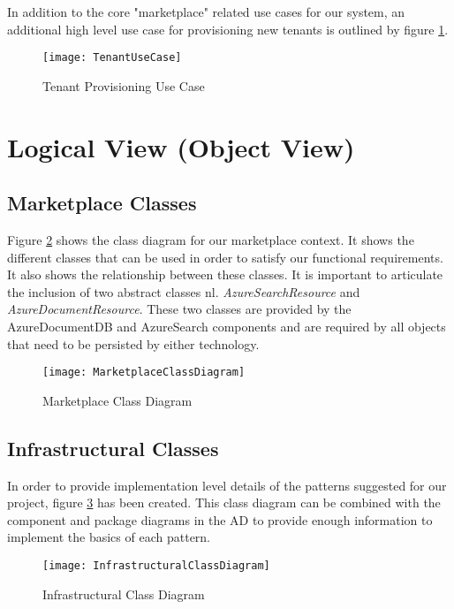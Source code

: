 In addition to the core "marketplace" related use cases for our system, an additional high level use case for provisioning new tenants is outlined by figure \ref{fig:tenantusecase}.

\begin{figure}
\centering
\texttt{[image: TenantUseCase]}
\caption{Tenant Provisioning Use Case}
\label{fig:tenantusecase}
\end{figure}

\section{Logical View (Object View)}

\subsection{Marketplace Classes}
Figure \ref{fig:marketclass} shows the class diagram for our marketplace context. It shows the different classes that can be used in order to satisfy our functional requirements. It also shows the relationship between these classes. It is important to articulate the inclusion of two abstract classes nl. \textit{AzureSearchResource} and \textit{AzureDocumentResource}. These two classes are provided by the AzureDocumentDB and AzureSearch components and are required by all objects that need to be persisted by either technology. 

\begin{figure}
\centering
\texttt{[image: MarketplaceClassDiagram]}
\caption{Marketplace Class Diagram}
\label{fig:marketclass}
\end{figure}

\subsection{Infrastructural Classes}
In order to provide implementation level details of the patterns suggested for our project, figure \ref{fig:infraclass} has been created. This class diagram can be combined with the component and package diagrams in the AD to provide enough information to implement the basics of each pattern. 

\begin{figure}
\centering
\texttt{[image: InfrastructuralClassDiagram]}
\caption{Infrastructural Class Diagram}
\label{fig:infraclass}
\end{figure}


